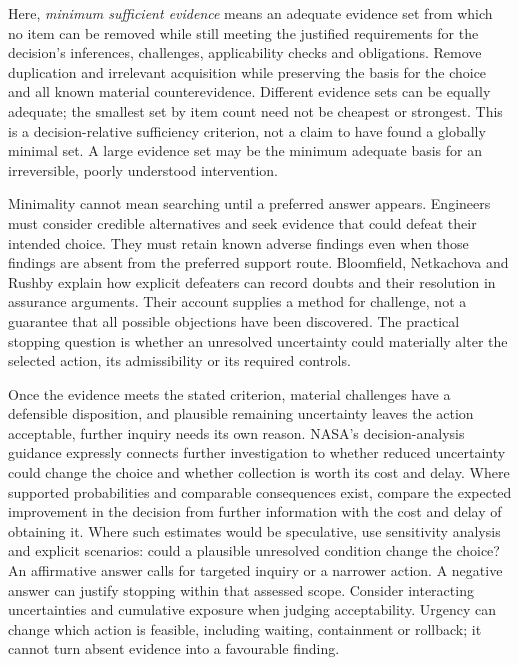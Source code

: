 \documentclass[11pt,a4paper]{article}
\begin{document}
Here, \emph{minimum sufficient evidence} means an adequate evidence set from which no item can be removed while still meeting the justified requirements for the decision's inferences, challenges, applicability checks and obligations. Remove duplication and irrelevant acquisition while preserving the basis for the choice and all known material counterevidence. Different evidence sets can be equally adequate; the smallest set by item count need not be cheapest or strongest. This is a decision-relative sufficiency criterion, not a claim to have found a globally minimal set. A large evidence set may be the minimum adequate basis for an irreversible, poorly understood intervention.

Minimality cannot mean searching until a preferred answer appears. Engineers must consider credible alternatives and seek evidence that could defeat their intended choice. They must retain known adverse findings even when those findings are absent from the preferred support route. Bloomfield, Netkachova and Rushby explain how explicit defeaters can record doubts and their resolution in assurance arguments.\cite{defeaters} Their account supplies a method for challenge, not a guarantee that all possible objections have been discovered. The practical stopping question is whether an unresolved uncertainty could materially alter the selected action, its admissibility or its required controls.

Once the evidence meets the stated criterion, material challenges have a defensible disposition, and plausible remaining uncertainty leaves the action acceptable, further inquiry needs its own reason. NASA's decision-analysis guidance expressly connects further investigation to whether reduced uncertainty could change the choice and whether collection is worth its cost and delay.\cite{nasa} Where supported probabilities and comparable consequences exist, compare the expected improvement in the decision from further information with the cost and delay of obtaining it. Where such estimates would be speculative, use sensitivity analysis and explicit scenarios: could a plausible unresolved condition change the choice? An affirmative answer calls for targeted inquiry or a narrower action. A negative answer can justify stopping within that assessed scope. Consider interacting uncertainties and cumulative exposure when judging acceptability. Urgency can change which action is feasible, including waiting, containment or rollback; it cannot turn absent evidence into a favourable finding.
\end{document}
